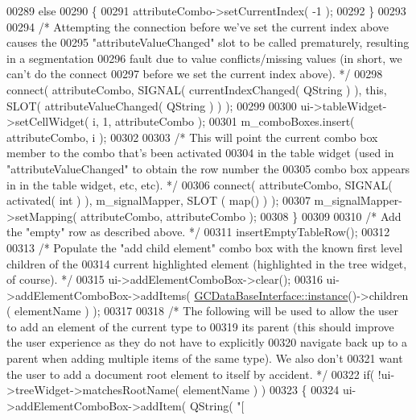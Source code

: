 \begin{DoxyCode}
00289       \textcolor{keywordflow}{else}
00290       \{
00291         attributeCombo->setCurrentIndex( -1 );
00292       \}
00293 
00294       \textcolor{comment}{/* Attempting the connection before we've set the current index above
       causes the}
00295 \textcolor{comment}{      "attributeValueChanged" slot to be called prematurely, resulting in a
       segmentation}
00296 \textcolor{comment}{      fault due to value conflicts/missing values (in short, we can't do the
       connect}
00297 \textcolor{comment}{      before we set the current index above). */}
00298       connect( attributeCombo, SIGNAL( currentIndexChanged( QString ) ), \textcolor{keyword}{this}, 
      SLOT( attributeValueChanged( QString ) ) );
00299 
00300       ui->tableWidget->setCellWidget( i, 1, attributeCombo );
00301       m\_comboBoxes.insert( attributeCombo, i );
00302 
00303       \textcolor{comment}{/* This will point the current combo box member to the combo that's been
       activated}
00304 \textcolor{comment}{      in the table widget (used in "attributeValueChanged" to obtain the row
       number the}
00305 \textcolor{comment}{      combo box appears in in the table widget, etc, etc). */}
00306       connect( attributeCombo, SIGNAL( activated( \textcolor{keywordtype}{int} ) ), m\_signalMapper, SLOT
      ( map() ) );
00307       m\_signalMapper->setMapping( attributeCombo, attributeCombo );
00308     \}
00309 
00310     \textcolor{comment}{/* Add the "empty" row as described above. */}
00311     insertEmptyTableRow();
00312 
00313     \textcolor{comment}{/* Populate the "add child element" combo box with the known first level
       children of the}
00314 \textcolor{comment}{    current highlighted element (highlighted in the tree widget, of course). */}
00315     ui->addElementComboBox->clear();
00316     ui->addElementComboBox->addItems( \hyperlink{class_g_c_data_base_interface_a1baea9c0667aa8b610ec30076fcab84c}{GCDataBaseInterface::instance}()->children
      ( elementName ) );
00317 
00318     \textcolor{comment}{/* The following will be used to allow the user to add an element of the
       current type to}
00319 \textcolor{comment}{    its parent (this should improve the user experience as they do not have to
       explicitly}
00320 \textcolor{comment}{    navigate back up to a parent when adding multiple items of the same type). 
       We also don't}
00321 \textcolor{comment}{    want the user to add a document root element to itself by accident. */}
00322     \textcolor{keywordflow}{if}( !ui->treeWidget->matchesRootName( elementName ) )
00323     \{
00324       ui->addElementComboBox->addItem( QString( \textcolor{stringliteral}{"[%
}
\end{DoxyCode}
